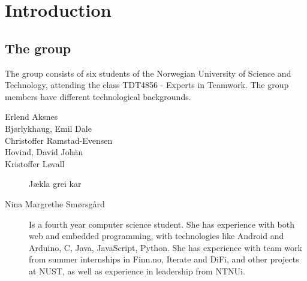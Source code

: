 \chapter{Introduction}
\section{The group}
The group consists of six students of the Norwegian University of Science and Technology, 
attending the class TDT4856 - Experts in Teamwork. The group members have different technological backgrounds.
\begin{description}
	\item[Erlend Aksnes] %
	\item[Bjørlykhaug, Emil Dale] %
	\item[Christoffer Ramstad-Evensen] %
	\item[Hovind, David Johän] %
	\item[Kristoffer Løvall] Jækla grei kar 
	\item[Nina Margrethe Smørsgård] \comment{\hfill \\}Is a fourth year computer science student. 
	She has experience with both web and embedded programming, with technologies like 
	Android and Arduino, C, Java, JavaScript, Python. She has experience with team 
	work from summer internships in Finn.no, Iterate and DiFi, and other projects at NUST, 
	as well as experience in leadership from NTNUi.
\end{description}